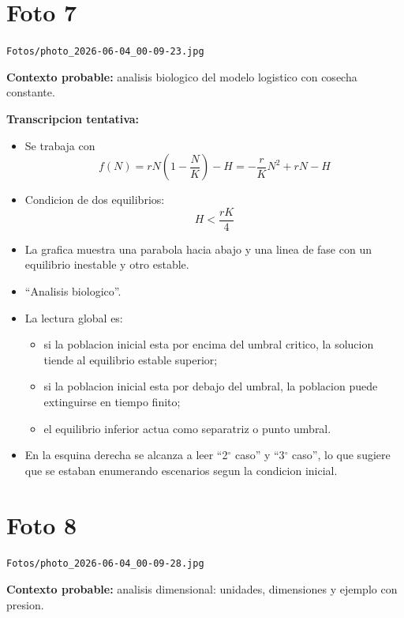 \documentclass[11pt,letterpaper]{article}
\begin{document}
\section*{Foto 7}
\texttt{Fotos/photo\_2026-06-04\_00-09-23.jpg}

\textbf{Contexto probable:} analisis biologico del modelo logistico con cosecha constante.

\textbf{Transcripcion tentativa:}
\begin{itemize}[leftmargin=*]
    \item Se trabaja con
    \[
    f(N)=rN\left(1-\frac{N}{K}\right)-H
    =-\frac{r}{K}N^2+rN-H
    \]
    \item Condicion de dos equilibrios:
    \[
    H<\frac{rK}{4}
    \]
    \item La grafica muestra una parabola hacia abajo y una linea de fase con un equilibrio inestable y otro estable.
    \item ``Analisis biologico''.
    \item La lectura global es:
    \begin{itemize}
        \item si la poblacion inicial esta por encima del umbral critico, la solucion tiende al equilibrio estable superior;
        \item si la poblacion inicial esta por debajo del umbral, la poblacion puede extinguirse en tiempo finito;
        \item el equilibrio inferior actua como separatriz o punto umbral.
    \end{itemize}
    \item En la esquina derecha se alcanza a leer ``2\(^\circ\) caso'' y ``3\(^\circ\) caso'', lo que sugiere que se estaban enumerando escenarios segun la condicion inicial.
\end{itemize}

\section*{Foto 8}
\texttt{Fotos/photo\_2026-06-04\_00-09-28.jpg}

\textbf{Contexto probable:} analisis dimensional: unidades, dimensiones y ejemplo con presion.
\end{document}
